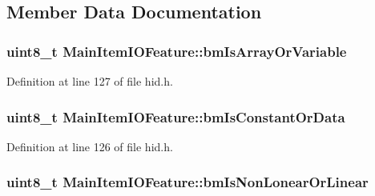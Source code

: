 \subsection{\-Member \-Data \-Documentation}
\hypertarget{struct_main_item_i_o_feature_adaf8eafeb85f6aff94e211601e76ee8f}{
\subsubsection[{bm\-Is\-Array\-Or\-Variable}]{\setlength{\rightskip}{0pt plus 5cm}uint8\-\_\-t {\bf \-Main\-Item\-I\-O\-Feature\-::bm\-Is\-Array\-Or\-Variable}}}\label{struct_main_item_i_o_feature_adaf8eafeb85f6aff94e211601e76ee8f}


\-Definition at line 127 of file hid.\-h.

\hypertarget{struct_main_item_i_o_feature_a5d578c79399be5da63790c7396fc5336}{
\subsubsection[{bm\-Is\-Constant\-Or\-Data}]{\setlength{\rightskip}{0pt plus 5cm}uint8\-\_\-t {\bf \-Main\-Item\-I\-O\-Feature\-::bm\-Is\-Constant\-Or\-Data}}}\label{struct_main_item_i_o_feature_a5d578c79399be5da63790c7396fc5336}


\-Definition at line 126 of file hid.\-h.

\hypertarget{struct_main_item_i_o_feature_abbe00a271ed4f5200399dd2ec5d18795}{
\subsubsection[{bm\-Is\-Non\-Lonear\-Or\-Linear}]{\setlength{\rightskip}{0pt plus 5cm}uint8\-\_\-t {\bf \-Main\-Item\-I\-O\-Feature\-::bm\-Is\-Non\-Lonear\-Or\-Linear}}}\label{struct_main_item_i_o_feature_abbe00a271ed4f5200399dd2ec5d18795}


